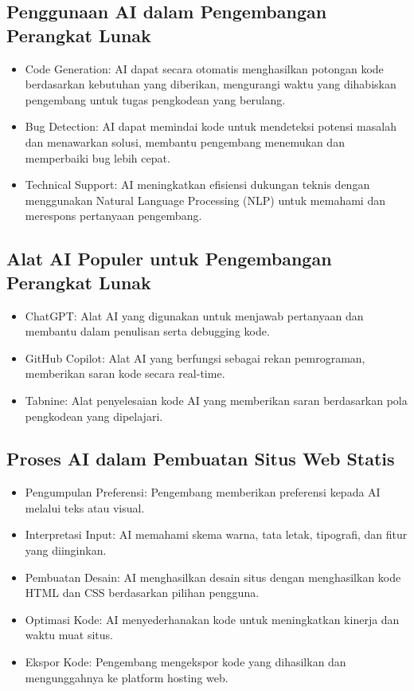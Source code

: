 \documentclass{article}
\begin{document}
\subsection{Penggunaan AI dalam Pengembangan Perangkat Lunak}
\begin{itemize}
    \item Code Generation: AI dapat secara otomatis menghasilkan potongan kode berdasarkan kebutuhan yang diberikan, mengurangi waktu yang dihabiskan pengembang untuk tugas pengkodean yang berulang.
    \item Bug Detection: AI dapat memindai kode untuk mendeteksi potensi masalah dan menawarkan solusi, membantu pengembang menemukan dan memperbaiki bug lebih cepat.
    \item Technical Support: AI meningkatkan efisiensi dukungan teknis dengan menggunakan Natural Language Processing (NLP) untuk memahami dan merespons pertanyaan pengembang.
\end{itemize}

\subsection{Alat AI Populer untuk Pengembangan Perangkat Lunak}
\begin{itemize}
    \item ChatGPT: Alat AI yang digunakan untuk menjawab pertanyaan dan membantu dalam penulisan serta debugging kode.
    \item GitHub Copilot: Alat AI yang berfungsi sebagai rekan pemrograman, memberikan saran kode secara real-time.
    \item Tabnine: Alat penyelesaian kode AI yang memberikan saran berdasarkan pola pengkodean yang dipelajari.
\end{itemize}

\subsection{Proses AI dalam Pembuatan Situs Web Statis}
\begin{itemize}
    \item Pengumpulan Preferensi: Pengembang memberikan preferensi kepada AI melalui teks atau visual.
    \item Interpretasi Input: AI memahami skema warna, tata letak, tipografi, dan fitur yang diinginkan.
    \item Pembuatan Desain: AI menghasilkan desain situs dengan menghasilkan kode HTML dan CSS berdasarkan pilihan pengguna.
    \item Optimasi Kode: AI menyederhanakan kode untuk meningkatkan kinerja dan waktu muat situs.
    \item Ekspor Kode: Pengembang mengekspor kode yang dihasilkan dan mengunggahnya ke platform hosting web.
\end{itemize}
\end{document}
